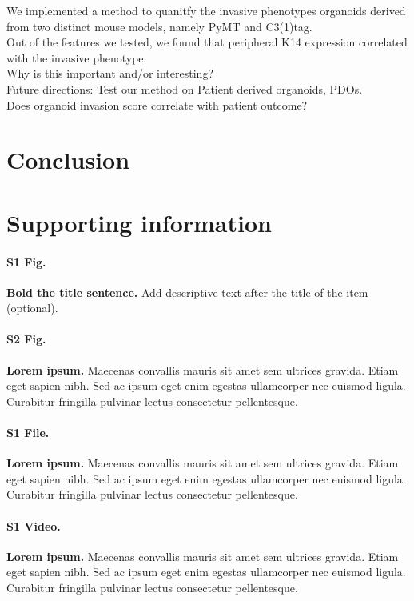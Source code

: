 \documentclass[10pt,letterpaper]{article}
\begin{document}
We implemented a method to quanitfy the invasive phenotypes organoids derived from two distinct mouse models, namely PyMT and C3(1)tag.\\
Out of the features we tested, we found that peripheral K14 expression correlated with the invasive phenotype.\\
Why is this important and/or interesting?\\
Future directions: Test our method on Patient derived organoids, PDOs.\\
Does organoid invasion score correlate with patient outcome?

\section*{Conclusion}


\section*{Supporting information}

\paragraph*{S1 Fig.}
\label{S1_Fig}
{\bf Bold the title sentence.} Add descriptive text after the title of the item (optional).

\paragraph*{S2 Fig.}
\label{S2_Fig}
{\bf Lorem ipsum.} Maecenas convallis mauris sit amet sem ultrices gravida. Etiam eget sapien nibh. Sed ac ipsum eget enim egestas ullamcorper nec euismod ligula. Curabitur fringilla pulvinar lectus consectetur pellentesque.

\paragraph*{S1 File.}
\label{S1_File}
{\bf Lorem ipsum.}  Maecenas convallis mauris sit amet sem ultrices gravida. Etiam eget sapien nibh. Sed ac ipsum eget enim egestas ullamcorper nec euismod ligula. Curabitur fringilla pulvinar lectus consectetur pellentesque.

\paragraph*{S1 Video.}
\label{S1_Video}
{\bf Lorem ipsum.}  Maecenas convallis mauris sit amet sem ultrices gravida. Etiam eget sapien nibh. Sed ac ipsum eget enim egestas ullamcorper nec euismod ligula. Curabitur fringilla pulvinar lectus consectetur pellentesque.
\end{document}
